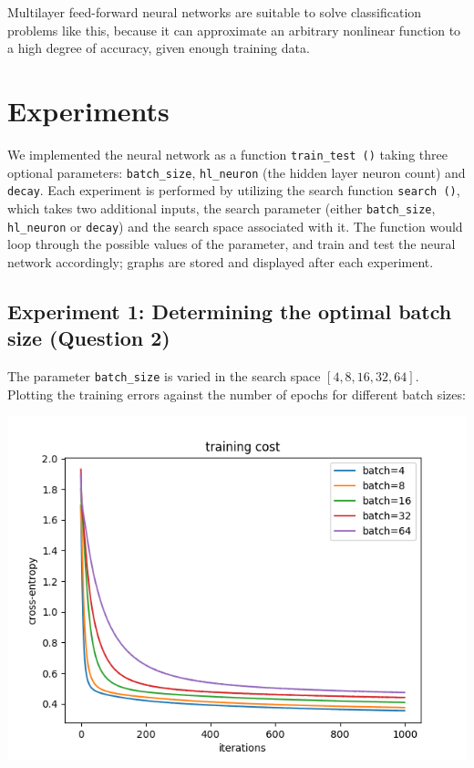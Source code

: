 Multilayer feed-forward neural networks are suitable to solve classification
problems like this, because it can approximate an arbitrary nonlinear
function to a high degree of accuracy, given enough training data.

\section*{Experiments}

We implemented the neural network as a function \texttt{train\_test\,()}
taking three optional parameters: 
\texttt{batch\_size}, \texttt{hl\_neuron} (the hidden layer neuron count) and
\texttt{decay}. Each experiment is performed by utilizing the search function
\texttt{search\,()}, which takes two additional inputs, the search parameter
(either \texttt{batch\_size}, \texttt{hl\_neuron} or \texttt{decay}) and the
search space associated with it. The function would loop through the possible
values of the parameter, and train and test the neural network accordingly;
graphs are stored and displayed after each experiment.

\subsection*{Experiment 1: Determining the optimal batch size (Question 2)}

The parameter \texttt{batch\_size} is varied in the search space
\([4,8,16,32,64]\).
Plotting the training errors against the number of epochs for different
batch sizes:

\begin{center}
    \includegraphics[width=\imgw]{images/p1a2_batch_cost.png}   
\end{center}

